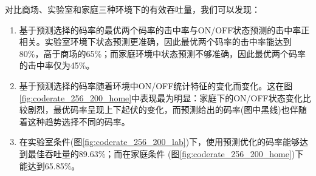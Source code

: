 对比商场、实验室和家庭三种环境下的有效吞吐量，我们可以发现：
\begin{enumerate}
	\item 基于预测选择的码率的最优两个码率的击中率与ON/OFF状态预测的击中率正相关。实验室环境下状态预测更准确，因此最优两个码率的击中率能达到80\%，高于商场的65\%；而家庭环境中状态预测不够准确，因此最优两个码率的击中率仅为45\%。
	
	\item 基于预测选择的码率随着环境中ON/OFF统计特征的变化而变化。这在图\ref{fig:coderate_256_200_home}中表现最为明显：家庭下的ON/OFF状态变化比较剧烈，最优码率呈现上下起伏的变化，而预测给出的码率(图中黑线)也伴随着这种趋势选择不同的码率。
	
	\item 在实验室条件(图\ref{fig:coderate_256_200_lab})下，使用预测优化的码率能够达到最佳吞吐量的89.63\%；而在家庭条件
	(图\ref{fig:coderate_256_200_home})下能达到65.85\%。
\end{enumerate}
